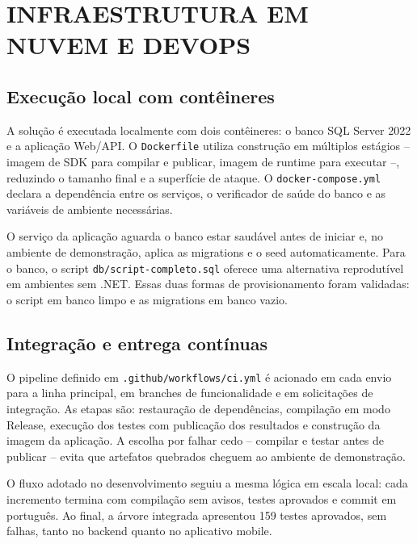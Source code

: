 \section{INFRAESTRUTURA EM NUVEM E DEVOPS}

\subsection{Execução local com contêineres}

A solução é executada localmente com dois contêineres: o banco SQL Server 2022 e
a aplicação Web/API. O \texttt{Dockerfile} utiliza construção em múltiplos
estágios -- imagem de SDK para compilar e publicar, imagem de runtime para
executar --, reduzindo o tamanho final e a superfície de ataque. O
\texttt{docker-compose.yml} declara a dependência entre os serviços, o
verificador de saúde do banco e as variáveis de ambiente necessárias.

O serviço da aplicação aguarda o banco estar saudável antes de iniciar e, no
ambiente de demonstração, aplica as migrations e o seed automaticamente. Para o
banco, o script \texttt{db/script-completo.sql} oferece uma alternativa
reprodutível em ambientes sem .NET. Essas duas formas de provisionamento foram
validadas: o script em banco limpo e as migrations em banco vazio.

\subsection{Integração e entrega contínuas}

O pipeline definido em \texttt{.github/workflows/ci.yml} é acionado em cada
envio para a linha principal, em branches de funcionalidade e em solicitações de
integração. As etapas são: restauração de dependências, compilação em modo
Release, execução dos testes com publicação dos resultados e construção da
imagem da aplicação. A escolha por falhar cedo -- compilar e testar antes de
publicar -- evita que artefatos quebrados cheguem ao ambiente de demonstração.

O fluxo adotado no desenvolvimento seguiu a mesma lógica em escala local: cada
incremento termina com compilação sem avisos, testes aprovados e commit em
português. Ao final, a árvore integrada apresentou 159 testes aprovados, sem
falhas, tanto no backend quanto no aplicativo mobile.

